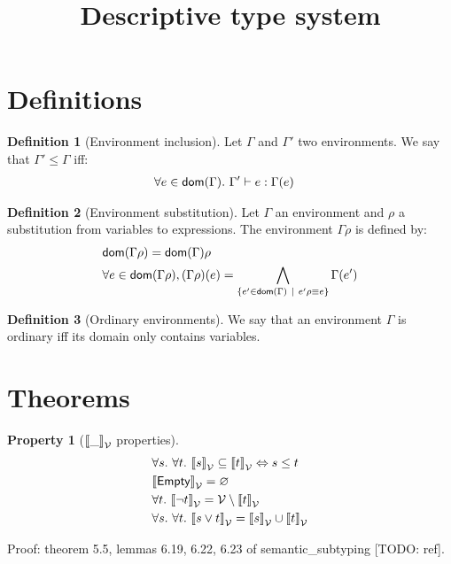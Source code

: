 \documentclass[a4paper]{article}
\title{\vspace{1.5cm}Descriptive type system}
\author{}
\date{\vspace{-5ex}}
\theoremstyle{definition}
\newtheorem{definition}{Definition}
\newtheorem{property}{Property}
\begin{document}
  \maketitle
  
    \section{Definitions}

      \begin{definition}[Environment inclusion]
        Let $\Gamma$ and $\Gamma'$ two environments. We say that $\Gamma' \leq \Gamma$ iff:
        \begin{align*}
          &\forall e \in \textsf{dom}(\Gamma).\ \Gamma' \vdash e : \Gamma(e)
        \end{align*}
      \end{definition}
    
      \begin{definition}[Environment substitution]
        Let $\Gamma$ an environment and $\rho$ a substitution from variables to expressions.
        The environment $\Gamma\rho$ is defined by:
        \begin{align*}
          &\textsf{dom}(\Gamma\rho) = \textsf{dom}(\Gamma) \rho\\
          &\forall e \in \textsf{dom}(\Gamma\rho), (\Gamma\rho)(e) = \bigwedge_{\{e' \in \textsf{dom}(\Gamma) ~|~ e'\rho\equiv e\}}\Gamma(e')
        \end{align*}
      \end{definition}
    
      \begin{definition}[Ordinary environments]
        We say that an environment $\Gamma$ is ordinary iff its domain only contains variables.
      \end{definition}

    \section{Theorems}

        \begin{property}[${\llbracket \_ \rrbracket}_{\mathcal{V}}$ properties]
          \begin{align*}
            &\forall s.\ \forall t.\ {\llbracket s \rrbracket}_{\mathcal{V}} \subseteq {\llbracket t \rrbracket}_{\mathcal{V}} \Leftrightarrow s \leq t\\
            &{\llbracket \textsf{Empty} \rrbracket}_{\mathcal{V}} = \varnothing\\
            &\forall t.\ {\llbracket \neg t \rrbracket}_{\mathcal{V}} = \mathcal{V} \setminus {\llbracket t \rrbracket}_{\mathcal{V}}\\
            &\forall s.\ \forall t.\ {\llbracket s\vee t \rrbracket}_{\mathcal{V}} = {\llbracket s \rrbracket}_{\mathcal{V}} \cup {\llbracket t \rrbracket}_{\mathcal{V}}
          \end{align*}
        \end{property}
        Proof: theorem 5.5, lemmas 6.19, 6.22, 6.23 of semantic_subtyping [TODO: ref].
\end{document}
